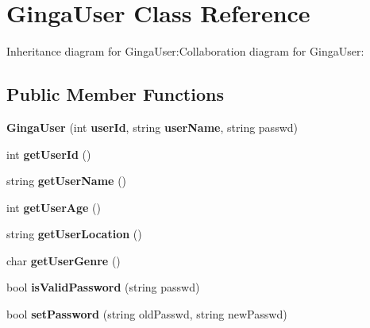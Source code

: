 \section{GingaUser Class Reference}
\label{classbr_1_1pucrio_1_1telemidia_1_1ginga_1_1core_1_1contextmanager_1_1GingaUser}
Inheritance diagram for GingaUser:Collaboration diagram for GingaUser:\subsection*{Public Member Functions}
\begin{CompactItemize}
\item 
\textbf{GingaUser} (int {\bf userId}, string {\bf userName}, string passwd)\label{classbr_1_1pucrio_1_1telemidia_1_1ginga_1_1core_1_1contextmanager_1_1GingaUser_989b3f12c3b8938fb8a49fb815759542}

\item 
int \textbf{getUserId} ()\label{classbr_1_1pucrio_1_1telemidia_1_1ginga_1_1core_1_1contextmanager_1_1GingaUser_cc351a64fe46205c8b0ae3b9942f6ccf}

\item 
string \textbf{getUserName} ()\label{classbr_1_1pucrio_1_1telemidia_1_1ginga_1_1core_1_1contextmanager_1_1GingaUser_e27e136f7e1ec6907d634bd80e0ac890}

\item 
int \textbf{getUserAge} ()\label{classbr_1_1pucrio_1_1telemidia_1_1ginga_1_1core_1_1contextmanager_1_1GingaUser_f3e306ffa67e775426cda225c4c65a17}

\item 
string \textbf{getUserLocation} ()\label{classbr_1_1pucrio_1_1telemidia_1_1ginga_1_1core_1_1contextmanager_1_1GingaUser_edb81927e009cd57fe792ff1259cf4ae}

\item 
char \textbf{getUserGenre} ()\label{classbr_1_1pucrio_1_1telemidia_1_1ginga_1_1core_1_1contextmanager_1_1GingaUser_5bd640c3bc00404bfeabc952b6a6bc5a}

\item 
bool \textbf{isValidPassword} (string passwd)\label{classbr_1_1pucrio_1_1telemidia_1_1ginga_1_1core_1_1contextmanager_1_1GingaUser_372b62e02ed1ba5f80ff1b458f0e9822}

\item 
bool \textbf{setPassword} (string oldPasswd, string newPasswd)\label{classbr_1_1pucrio_1_1telemidia_1_1ginga_1_1core_1_1contextmanager_1_1GingaUser_cc6ec3ec199f84f6e9f500bbc38827df}


\end{CompactItemize}
